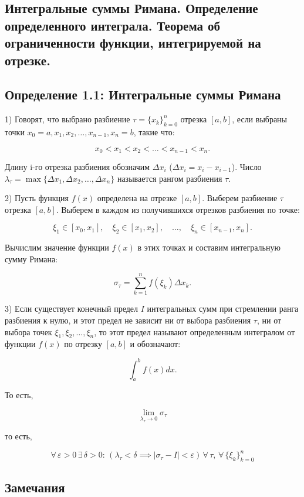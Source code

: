 {
\subsection{Интегральные суммы Римана. Определение определенного интеграла. Теорема об ограниченности функции, интегрируемой на отрезке.}

\subsection*{Определение 1.1: Интегральные суммы Римана}

1) Говорят, что выбрано разбиение \( \tau = \{x_k\}_{k=0}^{n} \) отрезка \( [a, b] \), если выбраны точки \( x_0 = a, x_1, x_2, \dots, x_{n-1}, x_n = b \), такие что:


\[
x_0 < x_1 < x_2 < \dots < x_{n-1} < x_n.
\]

Длину i-го отрезка разбиения обозначим \( \Delta x_i \) (\( \Delta x_i = x_i - x_{i-1} \)). Число \( \lambda_\tau = \max \{\Delta x_1, \Delta x_2, \dots, \Delta x_n\} \) называется рангом разбиения \( \tau \).

2) Пусть функция \( f(x) \) определена на отрезке \( [a, b] \). Выберем разбиение \( \tau \) отрезка \( [a, b] \). Выберем в каждом из получившихся отрезков разбиения по точке:

\[
\xi_1 \in [x_0, x_1], \quad \xi_2 \in [x_1, x_2], \quad \dots, \quad \xi_n \in [x_{n-1}, x_n].
\]

Вычислим значение функции \( f(x) \) в этих точках и составим интегральную сумму Римана:

\[
\sigma_\tau = \sum_{k=1}^{n} f(\xi_k) \Delta x_k.
\]

3) Если существует конечный предел \( I \) интегральных сумм при стремлении ранга разбиения к нулю, и этот предел не зависит ни от выбора разбиения \( \tau \), ни от выбора точек \( \xi_1, \xi_2, \dots, \xi_n \), то этот предел называют определенным интегралом от функции \( f(x) \) по отрезку \( [a, b] \) и обозначают:

\[
\int_a^b f(x)dx.
\]

То есть, 


\[
\lim_{\lambda_{\tau} \to 0} \sigma_{\tau}
\]


то есть,

\[
\forall \, \varepsilon > 0 \, \exists \, \delta > 0: \, \left( \lambda_{\tau} < \delta \implies |\sigma_{\tau} - I| < \varepsilon \right) \, \forall \, \tau, \, \forall \, \{ \xi_{k} \}_{k=0}^{n}
\]

\subsection*{Замечания}

}
